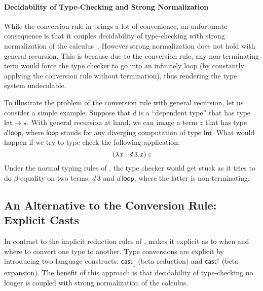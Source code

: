 \paragraph{Decidability of Type-Checking and Strong Normalization}
While the conversion rule in \coc brings a lot of convenience, an
unfortunate consequence is that it couples decidability of
type-checking with strong normalization of the
calculus~\cite{coc:decidability}.  However strong normalization does
not hold with general recursion. This is because due to the conversion
rule, any non-terminating term would force the type checker to go into
an infinitely loop (by constantly applying the conversion rule without
termination), thus rendering the type system undecidable.

To illustrate the problem of the conversion rule with general
recursion, let us consider a simple example. Suppose that
$d$ is a ``dependent type'' that has type $\mathsf{Int}  \rightarrow  \star$. With
general recursion at hand, we can image a term $z$ that has type
$d\,\mathsf{loop}$, where $\mathsf{loop}$ stands for any diverging
computation of type $ \mathsf{Int} $. What would happen if we try to type
check the following application: \[ (  \lambda  \mathit{x}  :  \mathit{d} \, 3  .  \mathit{x}  ) \, \mathit{z}\]
Under the normal typing rules of \coc, the type checker would get
stuck as it tries to do $\beta$-equality on two terms: $d\,3$ and
$d\,\mathsf{loop}$, where the latter is non-terminating.  

\subsection{An Alternative to the Conversion Rule: Explicit Casts}

In contrast to the implicit
reduction rules of \coc, \name makes it explicit as to when and where
to convert one type to another. Type conversions are explicit by
introducing two language constructs: $ \mathsf{cast}_{\downarrow} $ (beta reduction)
and $ \mathsf{cast}^{\uparrow} $ (beta expansion). The benefit of this approach is
that decidability of type-checking no longer is coupled with strong
normalization of the calculus.

